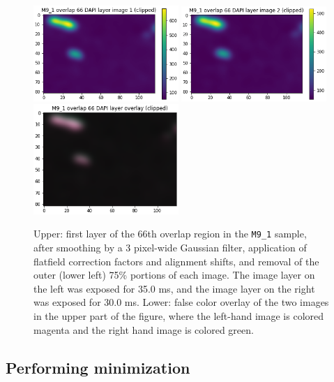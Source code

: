 \documentclass[letterpaper,11pt]{article}
\begin{document}
\begin{figure}[!ht]
\centering
\includegraphics[width=0.49\textwidth]{images/methods/smoothed_flatfielded_aligned_clipped_M9_1_overlap_66_dapi_image_1}
\includegraphics[width=0.49\textwidth]{images/methods/smoothed_flatfielded_aligned_clipped_M9_1_overlap_66_dapi_image_2}
\includegraphics[width=0.49\textwidth]{images/methods/smoothed_flatfielded_aligned_clipped_M9_1_overlap_66_dapi_overlay}
\caption{\footnotesize Upper: first layer of the 66th overlap region in the \texttt{M9\_1} sample, after smoothing by a 3 pixel-wide Gaussian filter, application of flatfield correction factors and alignment shifts, and removal of the outer (lower left) 75\% portions of each image. The image layer on the left was exposed for 35.0 ms, and the image layer on the right was exposed for 30.0 ms. Lower: false color overlay of the two images in the upper part of the figure, where the left-hand image is colored magenta and the right hand image is colored green.}
\label{fig:smoothed_flatfielded_aligned_clipped_M9_1_overlap_66}
\end{figure}

\clearpage

\subsection{Performing minimization}
\label{ssec:performing_minimization}
\end{document}
